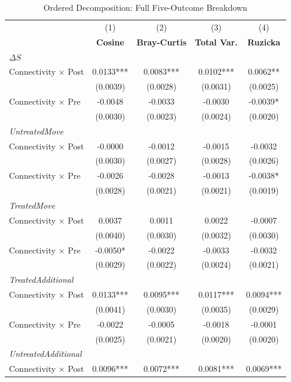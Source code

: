 \begin{table}[H]
\centering
\caption{Ordered Decomposition: Full Five-Outcome Breakdown}
\scriptsize
\setlength{\tabcolsep}{8pt}
\begin{tabular}{lcccc}
\hline\hline
 & (1) & (2) & (3) & (4) \\
 & \textbf{Cosine} & \textbf{Bray-Curtis} & \textbf{Total Var.} & \textbf{Ruzicka} \\
\hline
\multicolumn{5}{l}{\textit{$\Delta S$}} \\
\quad Connectivity $\times$ Post & 0.0133*** & 0.0083*** & 0.0102*** & 0.0062** \\
\quad & (0.0039) & (0.0028) & (0.0031) & (0.0025) \\
\quad Connectivity $\times$ Pre  & -0.0048 & -0.0033 & -0.0030 & -0.0039* \\
\quad & (0.0030) & (0.0023) & (0.0024) & (0.0020) \\
\hline
\multicolumn{5}{l}{\textit{UntreatedMove}} \\
\quad Connectivity $\times$ Post & -0.0000 & -0.0012 & -0.0015 & -0.0032 \\
\quad & (0.0030) & (0.0027) & (0.0028) & (0.0026) \\
\quad Connectivity $\times$ Pre  & -0.0026 & -0.0028 & -0.0013 & -0.0038* \\
\quad & (0.0028) & (0.0021) & (0.0021) & (0.0019) \\
\hline
\multicolumn{5}{l}{\textit{TreatedMove}} \\
\quad Connectivity $\times$ Post & 0.0037 & 0.0011 & 0.0022 & -0.0007 \\
\quad & (0.0040) & (0.0030) & (0.0032) & (0.0030) \\
\quad Connectivity $\times$ Pre  & -0.0050* & -0.0022 & -0.0033 & -0.0032 \\
\quad & (0.0029) & (0.0022) & (0.0024) & (0.0021) \\
\hline
\multicolumn{5}{l}{\textit{TreatedAdditional}} \\
\quad Connectivity $\times$ Post & 0.0133*** & 0.0095*** & 0.0117*** & 0.0094*** \\
\quad & (0.0041) & (0.0030) & (0.0035) & (0.0029) \\
\quad Connectivity $\times$ Pre  & -0.0022 & -0.0005 & -0.0018 & -0.0001 \\
\quad & (0.0025) & (0.0021) & (0.0020) & (0.0020) \\
\hline
\multicolumn{5}{l}{\textit{UntreatedAdditional}} \\
\quad Connectivity $\times$ Post & 0.0096*** & 0.0072*** & 0.0081*** & 0.0069*** \\

\end{tabular}
\end{table}
